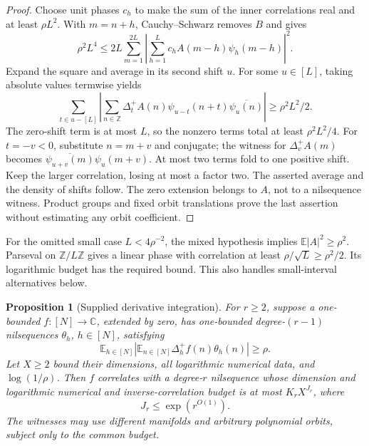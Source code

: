 \documentclass[11pt,a4paper]{article}
\newtheorem{proposition}[theorem]{Proposition}
\theoremstyle{definition}
\newcommand{\E}{\mathbb E}
\newcommand{\Z}{\mathbb Z}
\begin{document}
\begin{proof}
Choose unit phases \(c_h\) to make the sum of the inner
correlations real and at least \(\rho L^2\). With \(m=n+h\),
Cauchy--Schwarz removes \(B\) and gives
\[
 \rho^2L^4\le2L\sum_{m=1}^{2L}
 \left|\sum_{h=1}^L c_h A(m-h)\psi_h(m-h)\right|^2.
\]
Expand the square and average in its second shift \(u\).
For some \(u\in[L]\), taking absolute values termwise yields
\[
 \sum_{t\in u-[L]}
 \left|\sum_{n\in\Z}\Delta_t^+A(n)
       \psi_{u-t}(n+t)\overline{\psi_u(n)}\right|
 \ge\rho^2L^2/2.
\]
The zero-shift term is at most \(L\), so the nonzero terms
total at least \(\rho^2L^2/4\). For \(t=-v<0\), substitute
\(n=m+v\) and conjugate; the witness for \(\Delta_v^+A(m)\)
becomes \(\overline{\psi_{u+v}(m)}\psi_u(m+v)\).
At most two terms fold to one positive shift. Keep the larger
correlation, losing at most a factor two. The asserted average
and the density of shifts follow. The zero extension belongs to
\(A\), not to a nilsequence witness. Product groups and fixed
orbit translations prove the last assertion without estimating
any orbit coefficient.
\end{proof}

For the omitted small case \(L<4\rho^{-2}\), the mixed
hypothesis implies \(\E|A|^2\ge\rho^2\). Parseval on
\(\Z/L\Z\) gives a linear phase with correlation at least
\(\rho/\sqrt L\ge\rho^2/2\). Its logarithmic budget has the
required bound. This also handles small-interval alternatives below.

\begin{proposition}[Supplied derivative integration]\label{single:integration}
For \(r\ge2\), suppose a one-bounded \(f:[N]\to\mathbb C\),
extended by zero, has one-bounded degree-\((r-1)\) nilsequences
\(\theta_h\), \(h\in[N]\), satisfying
\[
 \E_{h\in[N]}
 \left|\E_{n\in[N]}\Delta_h^+f(n)\theta_h(n)\right|\ge\rho.
\]
Let \(X\ge2\) bound their dimensions, all logarithmic numerical
data, and \(\log(1/\rho)\). Then \(f\) correlates with a
degree-\(r\) nilsequence whose dimension and logarithmic numerical
and inverse-correlation budget is at most \(K_rX^{J_r}\), where
\[
 J_r\le\exp(r^{O(1)}).
\]
The witnesses may use different manifolds and arbitrary polynomial
orbits, subject only to the common budget.
\end{proposition}
\end{document}
